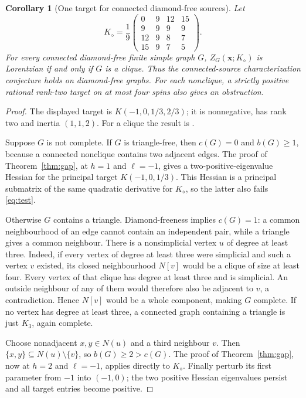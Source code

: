 \documentclass[11pt]{article}
\newtheorem{corollary}[theorem]{Corollary}
\theoremstyle{remark}
\begin{document}
\begin{corollary}[One target for connected diamond-free sources]
\label{cor:diamond}
Let
\begin{equation}
 K_{\diamond}=\frac19
 \begin{pmatrix}
 0&9&12&15\\9&9&9&9\\12&9&8&7\\15&9&7&5
 \end{pmatrix}.                                      \label{eq:diamondtarget}
\end{equation}
For every connected diamond-free finite simple graph $G$,
$Z_G(\mathbf x;K_{\diamond})$ is Lorentzian if and only if
$G$ is a clique. Thus the connected-source characterization
conjecture holds on diamond-free graphs. For each nonclique,
a strictly positive rational rank-two target on at most four
spins also gives an obstruction.
\end{corollary}
\begin{proof}
The displayed target is $K(-1,0,1/3,2/3)$; it is nonnegative,
has rank two and inertia $(1,1,2)$. For a clique the result is
\cite[Theorem 3.1]{LOS}.

Suppose $G$ is not complete. If $G$ is triangle-free, then
$c(G)=0$ and $b(G)\geq1$, because a connected nonclique contains
two adjacent edges. The proof of Theorem~\ref{thm:gap}, at
$h=1$ and $\ell=-1$, gives a two-positive-eigenvalue Hessian for
the principal target $K(-1,0,1/3)$. This Hessian is a principal
submatrix of the same quadratic derivative for $K_{\diamond}$,
so the latter also fails \eqref{eq:test}.

Otherwise $G$ contains a triangle. Diamond-freeness implies
$c(G)=1$: a common neighbourhood of an edge cannot contain an
independent pair, while a triangle gives a common neighbour.
There is a nonsimplicial vertex $u$ of degree at least three.
Indeed, if every vertex of degree at least three were simplicial
and such a vertex $v$ existed, its closed neighbourhood $N[v]$
would be a clique of size at least four. Every vertex of that clique
has degree at least three and is simplicial. An outside neighbour
of any of them would therefore also be adjacent to $v$, a
contradiction. Hence $N[v]$ would be a whole component, making
$G$ complete. If no vertex has degree at least three, a connected
graph containing a triangle is just $K_3$, again complete.

Choose nonadjacent $x,y\in N(u)$ and a third neighbour $v$.
Then $\{x,y\}\subseteq N(u)\setminus\{v\}$, so $b(G)\geq2>c(G)$.
The proof of Theorem~\ref{thm:gap}, now at $h=2$ and $\ell=-1$,
applies directly to $K_{\diamond}$. Finally perturb its first
parameter from $-1$ into $(-1,0)$; the two positive Hessian
eigenvalues persist and all target entries become positive.
\end{proof}
\end{document}
